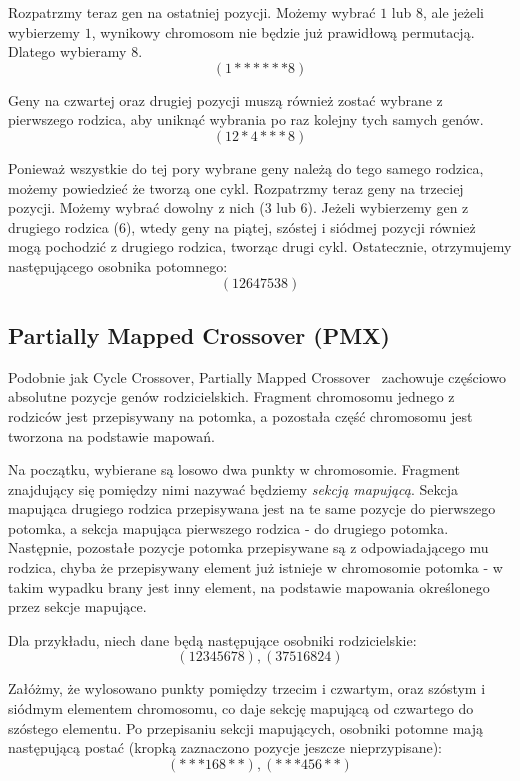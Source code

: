 \documentclass[brudnopis]{xmgr}
\begin{document}
Rozpatrzmy teraz gen na ostatniej pozycji. Możemy wybrać $1$ lub $8$, ale jeżeli wybierzemy $1$, wynikowy chromosom nie będzie już prawidłową permutacją. Dlatego wybieramy $8$.
$$ (1 * * * * * * 8) $$

Geny na czwartej oraz drugiej pozycji muszą również zostać wybrane z pierwszego rodzica, aby uniknąć wybrania po raz kolejny tych samych genów.
$$ (1 2 * 4 * * * 8) $$

Ponieważ wszystkie do tej pory wybrane geny należą do tego samego rodzica, możemy powiedzieć że tworzą one cykl. Rozpatrzmy teraz geny na trzeciej pozycji. Możemy wybrać dowolny z nich ($3$ lub $6$). Jeżeli wybierzemy gen z drugiego rodzica ($6$), wtedy geny na piątej, szóstej i siódmej pozycji również mogą pochodzić z drugiego rodzica, tworząc drugi cykl. Ostatecznie, otrzymujemy następującego osobnika potomnego:
$$ (1 2 6 4 7 5 3 8) $$


\subsection{Partially Mapped Crossover (PMX)}

Podobnie jak Cycle Crossover, Partially Mapped Crossover~\cite{Larranaga99geneticalgorithms} zachowuje częściowo absolutne pozycje genów rodzicielskich. Fragment chromosomu jednego z rodziców jest przepisywany na potomka, a pozostała część chromosomu jest tworzona na podstawie mapowań.

Na początku, wybierane są losowo dwa punkty w chromosomie. Fragment znajdujący się pomiędzy nimi nazywać będziemy \emph{sekcją mapującą}. Sekcja mapująca drugiego rodzica przepisywana jest na te same pozycje do pierwszego potomka, a sekcja mapująca pierwszego rodzica - do drugiego potomka. Następnie, pozostałe pozycje potomka przepisywane są z odpowiadającego mu rodzica, chyba że przepisywany element już istnieje w chromosomie potomka - w takim wypadku brany jest inny element, na podstawie mapowania określonego przez sekcje mapujące.

Dla przykładu, niech dane będą następujące osobniki rodzicielskie:
$$ (1 2 3 4 5 6 7 8), (3 7 5 1 6 8 2 4) $$

Załóżmy, że wylosowano punkty pomiędzy trzecim i czwartym, oraz szóstym i siódmym elementem chromosomu, co daje sekcję mapującą od czwartego do szóstego elementu. Po przepisaniu sekcji mapujących, osobniki potomne mają następującą postać (kropką zaznaczono pozycje jeszcze nieprzypisane):
$$ (* * * 1 6 8 * *), (* * * 4 5 6 * *) $$
\end{document}
